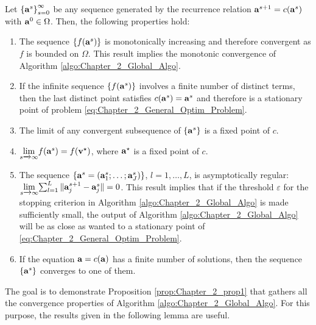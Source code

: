 \documentclass[
]{jss}
\begin{document}
\begin{proposition}
    Let $\left\lbrace \mathbf{a}^s\right\rbrace_{s=0}^{\infty}$ be any sequence 
    generated by the recurrence relation $\mathbf{a}^{s+1} = c(\mathbf{a}^s)$ with 
    $\mathbf{a}^0\in\Omega$. Then, the following properties hold:
    \begin{enumerate}[topsep=0pt,itemsep=-0.75ex,partopsep=1ex,parsep=1ex, label = {(\alph*)}]
        \item The sequence $\left\lbrace f(\mathbf{a}^s)\right\rbrace $ is monotonically increasing and therefore convergent as $f$ is bounded on $\Omega$. This result implies the monotonic convergence of Algorithm \ref{algo:Chapter_2_Global_Algo}.
        \item If the infinite sequence $\left\lbrace f(\mathbf{a}^s)\right\rbrace $ involves a finite number of distinct terms, then the last distinct point satisfies $c(\mathbf{a}^s) = \mathbf{a}^s$ and therefore is a stationary point of problem \eqref{eq:Chapter_2_General_Optim_Problem}. 
        \item The limit of any convergent subsequence of $\left\lbrace \mathbf{a}^s\right\rbrace $ is a fixed point of $c$.
        \item $\underset{s\xrightarrow[]{}\infty}\lim{f(\ensuremath{\mathbf{a}}^s) = f(\ensuremath{\mathbf{v^\star}})}$, where $\mathbf{a}^\star$ is a fixed point of $c$.
        \item The sequence $\left\lbrace \mathbf{a}^s = \left(\mathbf{a}_1^{s}; \ldots; \mathbf{a}_J^{s} \right) \right\rbrace $, $l = 1, \ldots, L$, is asymptotically regular: $\underset{s\xrightarrow[]{}\infty}\lim{\sum_{l=1}^{L} \Vert \ensuremath{\mathbf{a}}_j^{s+1} - \ensuremath{\mathbf{a}}_j^s \Vert} = 0$. This result implies that if the threshold $\varepsilon$ for the stopping criterion in Algorithm \ref{algo:Chapter_2_Global_Algo} is made sufficiently small, the output of Algorithm \ref{algo:Chapter_2_Global_Algo} will be as close as wanted to a stationary point of \eqref{eq:Chapter_2_General_Optim_Problem}. 
        \item If the equation $\mathbf{a} = c(\mathbf{a})$ has a finite number of solutions, then the sequence $\left\lbrace \mathbf{a}^s\right\rbrace $ converges to one of them.
    \end{enumerate}
    \label{prop:Chapter_2_prop1}
\end{proposition}

The goal is to demonstrate Proposition \ref{prop:Chapter_2_prop1} that
gathers all the convergence properties of Algorithm
\ref{algo:Chapter_2_Global_Algo}. For this purpose, the results given in
the following lemma are useful.
\end{document}

